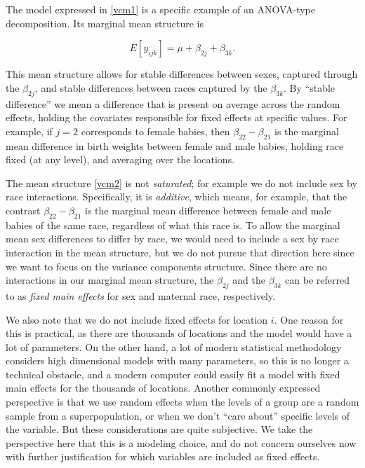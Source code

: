 The model expressed in \ref{vcm1} is a specific example of an ANOVA-type decomposition. Its marginal mean structure is

\begin{equation}
E[y_{ijk}] = \mu + \beta_{2j} + \beta_{3k}. \label{vcm2}
\end{equation}

\noindent This mean structure allows for stable differences between sexes, captured through the $\beta_{2j}$, and stable differences between races captured by the $\beta_{3k}$. By ``stable difference'' we mean a difference that is present on average across the random effects, holding the covariates responsible for fixed effects at specific values. For example, if $j=2$ corresponds to female babies, then $\beta_{22} - \beta_{21}$ is the marginal mean difference in birth weights between female and male babies, holding race fixed (at any level), and averaging over the locations.

The mean structure \ref{vcm2} is not \textit{saturated}; for example we do not include sex by race interactions. Specifically, it is \textit{additive}, which means, for example, that the contrast $\beta_{22} - \beta_{21}$ is the marginal mean difference between female and male babies of the same race, regardless of what this race is. To allow the marginal mean sex differences to differ by race, we would need to include a sex by race interaction in the mean structure, but we do not pursue that direction here since we want to focus on the variance components structure. Since there are no interactions in our marginal mean structure, the $\beta_{2j}$ and the $\beta_{3k}$ can be referred to as \textit{fixed main effects} for sex and maternal race, respectively.

We also note that we do not include fixed effects for location $i$. One reason for this is practical, as there are thousands of locations and the model would have a lot of parameters. On the other hand, a lot of modern statistical methodology considers high dimensional models with many parameters, so this is no longer a technical obstacle, and a modern computer could easily fit a model with fixed main effects for the thousands of locations. Another commonly expressed perspective is that we use random effects when the levels of a group are a random sample from a superpopulation, or when we don't ``care about'' specific levels of the variable. But these considerations are quite subjective. We take the perspective here that this is a modeling choice, and do not concern ourselves now with further justification for which variables are included as fixed effects.

